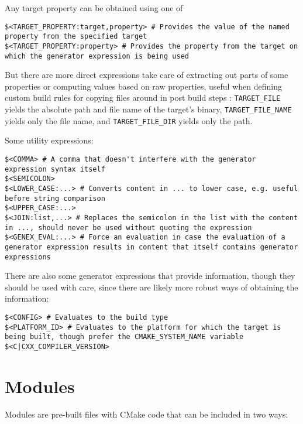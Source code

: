 \documentclass[8pt, table, xcdraw]{article}%
\begin{document}
Any target property can be obtained using one of

\begin{lstlisting}
$<TARGET_PROPERTY:target,property> # Provides the value of the named property from the specified target
$<TARGET_PROPERTY:property> # Provides the property from the target on which the generator expression is being used
\end{lstlisting}

But there are more direct expressions take care of extracting out parts of some properties or computing values based on raw properties, useful when defining custom build rules for copying files around in post build steps : \lstinline{TARGET_FILE} yields the absolute path and file name of the target’s binary, \lstinline{TARGET_FILE_NAME} yields only the file name, and \lstinline{TARGET_FILE_DIR} yields only the path.

Some utility expressions:

\begin{lstlisting}
$<COMMA> # A comma that doesn't interfere with the generator expression syntax itself
$<SEMICOLON>
$<LOWER_CASE:...> # Converts content in ... to lower case, e.g. useful before string comparison
$<UPPER_CASE:...>
$<JOIN:list,...> # Replaces the semicolon in the list with the content in ..., should never be used without quoting the expression
$<GENEX_EVAL:...> # Force an evaluation in case the evaluation of a generator expression results in content that itself contains generator expressions
\end{lstlisting}

There are also some generator expressions that provide information, though they should be used with care, since there are likely more robust ways of obtaining the information:

\begin{lstlisting}
$<CONFIG> # Evaluates to the build type
$<PLATFORM_ID> # Evaluates to the platform for which the target is being built, though prefer the CMAKE_SYSTEM_NAME variable
$<C|CXX_COMPILER_VERSION>
\end{lstlisting}

\section{Modules} \label{modules}

Modules are pre-built files with CMake code that can be included in two ways:
\end{document}
